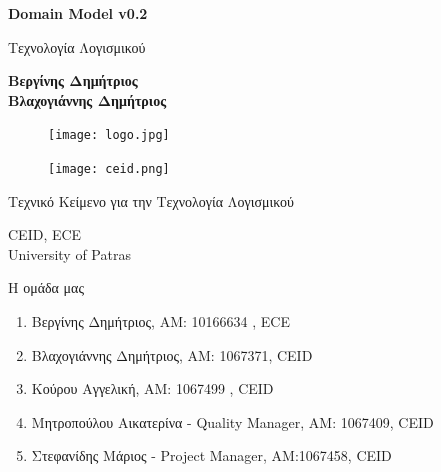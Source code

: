 \documentclass{article}
\begin{document}
\begin{titlepage}
   \begin{center}
       \vspace*{1cm}

       \textbf{\huge Domain Model v0.2}

       \vspace{0.5cm}
        Τεχνολογία Λογισμικού
            
       \vspace{1cm}

       \textbf{Βεργίνης Δημήτριος\\Βλαχογιάννης Δημήτριος}
       
       \begin{figure}[!htb]
        \centering
        \texttt{[image: logo.jpg]}
        \end{figure}
        
        \vspace{0.5cm}
        
        \begin{figure}[!htb]
        \centering
        \texttt{[image: ceid.png]}
        \end{figure}


       \vfill
            
       Τεχνικό Κείμενο για την Τεχνολογία Λογισμικού\\
            
       \vspace{0.5cm}
            
       CEID, ECE\\
       University of Patras\\
            
   \end{center}
\end{titlepage}

\noindent Η ομάδα μας

\begin{enumerate}
  \item Βεργίνης Δημήτριος, ΑΜ: 10166634 , ECE
  \item Βλαχογιάννης Δημήτριος, ΑΜ: 1067371, CEID
  \item Κούρου Αγγελική, ΑΜ: 1067499 , CEID
  \item Μητροπούλου Αικατερίνα - Quality Manager, ΑΜ: 1067409, CEID
  \item Στεφανίδης Μάριος - Project Manager, ΑΜ:1067458, CEID
\end{enumerate}
{
  \hypersetup{linkcolor=black}
  \tableofcontents
}
\end{document}
